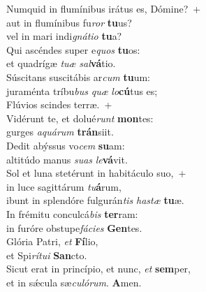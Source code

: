 \evenverse Numquid in flumínibus irátus es, Dómine?~+\\\evenverse  aut in flumínibus fu\textit{ror} \textbf{tu}us?~\*\\
\evenverse vel in mari indi\textit{gná}\textit{ti}\textit{o} \textbf{tu}a?\\
\oddverse Qui ascéndes super e\textit{quos} \textbf{tu}os:~\*\\
\oddverse et quadrígæ \textit{tu}\textit{æ} \textit{sal}\textbf{vá}tio.\\
\evenverse Súscitans suscitábis ar\textit{cum} \textbf{tu}um:~\*\\
\evenverse juraménta tríbu\textit{bus} \textit{quæ} \textit{lo}\textbf{cú}tus es;\\
\oddverse Flúvios scindes terræ.~+\\
\oddverse  Vidérunt te, et dolué\textit{runt} \textbf{mon}tes:~\*\\
\oddverse gurges \textit{a}\textit{quá}\textit{rum} \textbf{trán}siit.\\
\evenverse Dedit abýssus vo\textit{cem} \textbf{su}am:~\*\\
\evenverse altitúdo manus \textit{su}\textit{as} \textit{le}\textbf{vá}vit.\\
\oddverse Sol et luna stetérunt in habitáculo suo,~+\\
\oddverse  in luce sagittárum \textit{tu}\textbf{á}rum,~\*\\
\oddverse ibunt in splendóre fulgurán\textit{tis} \textit{ha}\textit{stæ} \textbf{tu}æ.\\
\evenverse In frémitu conculcá\textit{bis} \textbf{ter}ram:~\*\\
\evenverse in furóre obstupe\textit{fá}\textit{ci}\textit{es} \textbf{Gen}tes.\\
\oddverse Glória Patri, \textit{et} \textbf{Fí}lio,~\*\\
\oddverse et Spi\textit{rí}\textit{tu}\textit{i} \textbf{San}cto.\\
\evenverse Sicut erat in princípio, et nunc, \textit{et} \textbf{sem}per,~\*\\
\evenverse et in sǽcula sæ\textit{cu}\textit{ló}\textit{rum}. \textbf{A}men.\\
